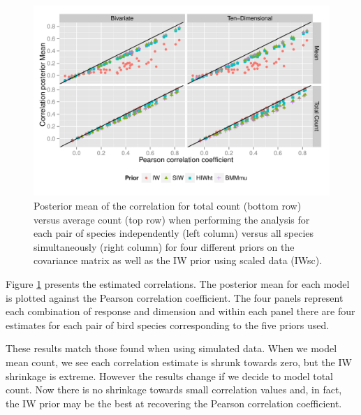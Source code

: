 \documentclass[12pt]{article}
\newcommand{\matt}[1]{\textcolor{red}{(matt: #1)}}
\begin{document}
\begin{figure}[hbpt]
\centering
\includegraphics[width=\textwidth]{rescorr}
 \vspace{-.5in}
\caption{Posterior mean of the correlation for total count (bottom row) versus average count (top row) when performing the analysis for each pair of species independently (left column) versus all species simultaneously (right column) for four different priors on the covariance matrix as well as the IW prior using scaled data (IWsc).}
\label{fig:coring}
\end{figure}
%

Figure \ref{fig:coring} presents the estimated correlations. The posterior mean for each model is plotted against the Pearson correlation coefficient. The four panels represent each combination of response and dimension and within each panel there are four estimates for each pair of bird species corresponding to the five priors used. 

These results match those found when using simulated data. When we model mean count, we see each correlation estimate is shrunk towards zero, but the IW shrinkage is extreme. However the results change if we decide to model total count. Now there is no shrinkage towards small correlation values and, in fact, the IW prior may be the best at recovering the Pearson correlation coefficient.
\end{document}
